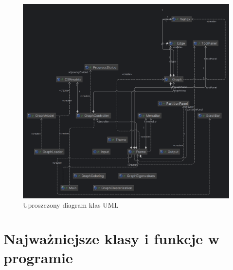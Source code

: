 \documentclass{article}
\begin{document}
    \begin{figure}[H]
        \centering
        \includegraphics[width=1\linewidth]{img/UML.png}
        \caption{Uproszczony diagram klas UML}
        \label{fig:uml}
    \end{figure}



\section{Najważniejsze klasy i funkcje w programie}
\end{document}

